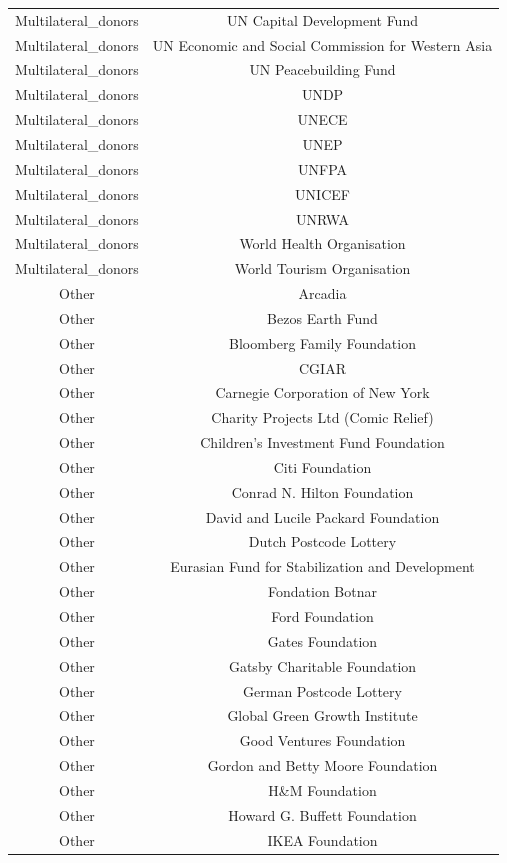 \begin{longtable}{cc}
Multilateral\_donors & UN Capital Development Fund \\
Multilateral\_donors & UN Economic and Social Commission for Western Asia \\
Multilateral\_donors & UN Peacebuilding Fund \\
Multilateral\_donors & UNDP \\
Multilateral\_donors & UNECE \\
Multilateral\_donors & UNEP \\
Multilateral\_donors & UNFPA \\
Multilateral\_donors & UNICEF \\
Multilateral\_donors & UNRWA \\
Multilateral\_donors & World Health Organisation \\
Multilateral\_donors & World Tourism Organisation \\
Other & Arcadia \\
Other & Bezos Earth Fund \\
Other & Bloomberg Family Foundation \\
Other & CGIAR \\
Other & Carnegie Corporation of New York \\
Other & Charity Projects Ltd (Comic Relief) \\
Other & Children's Investment Fund Foundation \\
Other & Citi Foundation \\
Other & Conrad N. Hilton Foundation \\
Other & David and Lucile Packard Foundation \\
Other & Dutch Postcode Lottery \\
Other & Eurasian Fund for Stabilization and Development \\
Other & Fondation Botnar \\
Other & Ford Foundation \\
Other & Gates Foundation \\
Other & Gatsby Charitable Foundation \\
Other & German Postcode Lottery \\
Other & Global Green Growth Institute \\
Other & Good Ventures Foundation \\
Other & Gordon and Betty Moore Foundation \\
Other & H\&M Foundation \\
Other & Howard G. Buffett Foundation \\
Other & IKEA Foundation \\

\end{longtable}
